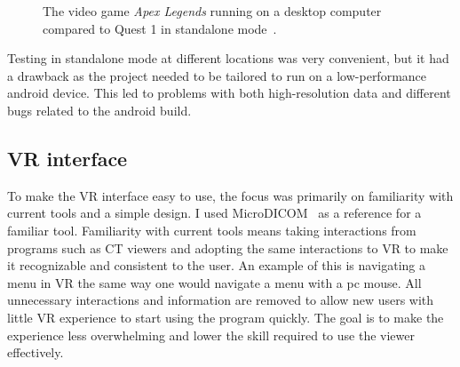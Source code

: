 \documentclass[a4paper]{report}
\begin{document}
\begin{figure}[h!]
    \centering

	\hfill
	\caption{The video game \emph{Apex Legends} running on a desktop computer compared to Quest 1 in standalone mode~\cite{tyriel_wood_-_vr_tech_oculus_2019}.}\label{comp}
  \small

\end{figure}
Testing in standalone mode at different locations was very convenient, but it had a drawback as the project needed to be tailored to run on a low-performance android device. This led to problems with both high-resolution data and different bugs related to the android build.

\subsection{VR interface}


To make the VR interface easy to use, the focus was primarily on familiarity with current tools and a simple design.
I used MicroDICOM~\cite{noauthor_dicom_nodate-1} as a reference for a familiar tool.
Familiarity with current tools means taking interactions from programs such as CT viewers and adopting the same interactions to VR to make it recognizable and consistent to the user. An example of this is navigating a menu in VR the same way one would navigate a menu with a pc mouse.
 All unnecessary interactions and information are removed to allow new users with little VR experience to start using the program quickly. The goal is to make the experience less overwhelming and lower the skill required to use the viewer effectively.
\end{document}
